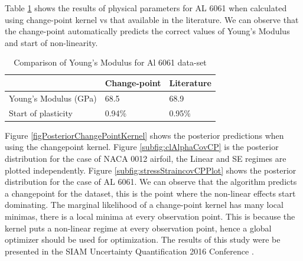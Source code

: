 Table \ref{tabComparisonOfYoungModulus6061Data} shows the results of physical parameters for AL 6061 when calculated using change-point kernel vs that available in the literature. We can observe that the change-point automatically predicts the correct values of Young's Modulus and start of non-linearity.


\begin{table}[!h]
    \centering
\begin{tabular}{|l|l|l|}
  \hline
    & Change-point & Literature \\
  \hline 
  \hline
Young's Modulus (GPa) &  68.5 & 68.9\\
Start of plasticity  & 0.94\% & 0.95\%\\
   \hline
\end{tabular}
\caption{Comparison of Young's Modulus for Al 6061 data-set}
  \label{tabComparisonOfYoungModulus6061Data}
\end{table}

Figure \ref{figPosteriorChangePointKernel} shows the posterior predictions when using the changepoint kernel. Figure \ref{subfig:clAlphaCovCP} is the posterior distribution for the case of NACA 0012 airfoil, the Linear and SE regimes are plotted independently. Figure \ref{subfig:stressStraincovCPPlot} shows the posterior distribution for the case of AL 6061. We can observe that the algorithm predicts a changepoint for the dataset, this is the point where the non-linear effects start dominating. The marginal likelihood of a change-point kernel has many local minimas, there is a local minima at every observation point. This is because the kernel puts a non-linear regime at every observation point, hence a global optimizer should be used for optimization. The results of this study were be presented in the SIAM Uncertainty Quantification 2016 Conference \cite{chiplunkar:hal-01555401}.


